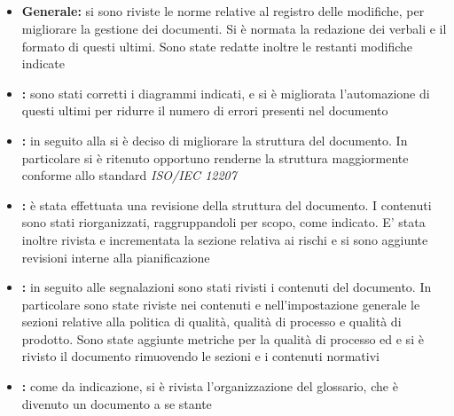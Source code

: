 \documentclass[12pt,a4paper]{article}
\begin{document}
	\subsection{\RR{}}
	\begin{itemize}
		\item \textbf{Generale:} si sono riviste le norme relative al registro delle modifiche, per migliorare la gestione dei documenti. Si è normata la redazione dei verbali e il formato di questi ultimi. Sono state redatte inoltre le restanti modifiche indicate 
		\item \textbf{\AdR{}:} sono stati corretti i diagrammi indicati, e si è migliorata l'automazione di questi ultimi per ridurre il numero di errori presenti nel documento
		\item \textbf{\NdP{}:} in seguito alla \RR{} si è deciso di migliorare la struttura del documento. In particolare si è ritenuto opportuno renderne la struttura maggiormente conforme allo standard \textit{ISO/IEC 12207}
		\item \textbf{\PdP{}:} è stata effettuata una revisione della struttura del documento. I contenuti sono stati riorganizzati, raggruppandoli per scopo, come indicato. E' stata inoltre rivista e incrementata la sezione relativa ai rischi e si sono aggiunte revisioni interne alla pianificazione
		\item \textbf{\PdQ{}:} in seguito alle segnalazioni sono stati rivisti i contenuti del documento. In particolare sono state riviste nei contenuti e nell'impostazione generale le sezioni relative alla politica di qualità, qualità di processo e qualità di prodotto. Sono state aggiunte metriche per la qualità di processo ed e si è rivisto il documento rimuovendo le sezioni e i contenuti normativi
		\item \textbf{\GL{}:} come da indicazione, si è rivista l'organizzazione del glossario, che è divenuto un documento a se stante
	\end{itemize}
	
\end{document}
